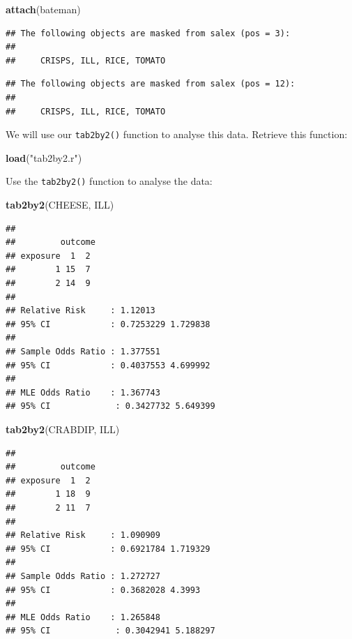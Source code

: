 \documentclass[12pt,a4paper]{book}
\newenvironment{Shaded}{\begin{snugshade}}{\end{snugshade}}
\newcommand{\KeywordTok}[1]{\textcolor[rgb]{0.13,0.29,0.53}{\textbf{#1}}}
\newcommand{\StringTok}[1]{\textcolor[rgb]{0.31,0.60,0.02}{#1}}
\newcommand{\NormalTok}[1]{#1}
\theoremstyle{definition}
\theoremstyle{definition}
\theoremstyle{definition}
\theoremstyle{remark}
\begin{document}
\begin{Shaded}
\begin{Highlighting}[]
\KeywordTok{attach}\NormalTok{(bateman)}
\end{Highlighting}
\end{Shaded}

\begin{verbatim}
## The following objects are masked from salex (pos = 3):
## 
##     CRISPS, ILL, RICE, TOMATO
\end{verbatim}

\begin{verbatim}
## The following objects are masked from salex (pos = 12):
## 
##     CRISPS, ILL, RICE, TOMATO
\end{verbatim}

We will use our \texttt{tab2by2()} function to analyse this data.
Retrieve this function:

\begin{Shaded}
\begin{Highlighting}[]
\KeywordTok{load}\NormalTok{(}\StringTok{"tab2by2.r"}\NormalTok{)}
\end{Highlighting}
\end{Shaded}

Use the \texttt{tab2by2()} function to analyse the data:

\begin{Shaded}
\begin{Highlighting}[]
\KeywordTok{tab2by2}\NormalTok{(CHEESE, ILL)}
\end{Highlighting}
\end{Shaded}

\begin{verbatim}
## 
##         outcome
## exposure  1  2
##        1 15  7
##        2 14  9
## 
## Relative Risk     : 1.12013 
## 95% CI            : 0.7253229 1.729838 
## 
## Sample Odds Ratio : 1.377551 
## 95% CI            : 0.4037553 4.699992 
## 
## MLE Odds Ratio    : 1.367743 
## 95% CI             : 0.3427732 5.649399
\end{verbatim}

\begin{Shaded}
\begin{Highlighting}[]
\KeywordTok{tab2by2}\NormalTok{(CRABDIP, ILL)}
\end{Highlighting}
\end{Shaded}

\begin{verbatim}
## 
##         outcome
## exposure  1  2
##        1 18  9
##        2 11  7
## 
## Relative Risk     : 1.090909 
## 95% CI            : 0.6921784 1.719329 
## 
## Sample Odds Ratio : 1.272727 
## 95% CI            : 0.3682028 4.3993 
## 
## MLE Odds Ratio    : 1.265848 
## 95% CI             : 0.3042941 5.188297
\end{verbatim}
\end{document}
